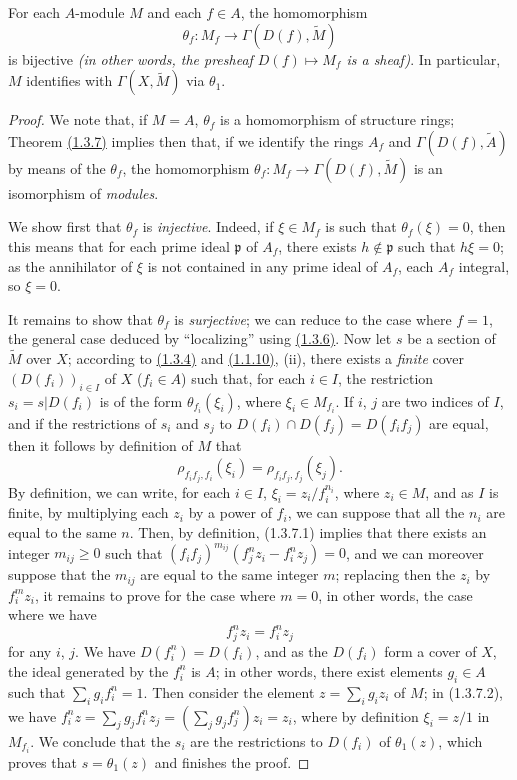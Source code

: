 \begin{thm}[1.3.7]
\label{thm-1.1.3.7}
For each $A$-module $M$ and each $f\in A$, the homomorphism
\[
  \theta_f:M_f\longrightarrow\Gamma(D(f),\widetilde{M})
\]
is bijective {\em (in other words, the presheaf $D(f)\mapsto M_f$ is a {\em sheaf})}. In
particular, $M$ identifies with $\Gamma(X,\widetilde{M})$ via $\theta_1$.
\end{thm}

\begin{proof}
\label{proof-thm-1.1.3.7}
We note that, if $M=A$, $\theta_f$ is a homomorphism of structure rings; Theorem
\hyperref[thm-1.1.3.7]{(1.3.7)} implies then that, if we identify the rings $A_f$ and
$\Gamma(D(f),\widetilde{A})$ by means of the $\theta_f$, the homomorphism
$\theta_f:M_f\to\Gamma(D(f),\widetilde{M})$ is an isomorphism of {\em modules}.

We show first that $\theta_f$ is {\em injective}. Indeed, if $\xi\in M_f$ is such that
$\theta_f(\xi)=0$, then this means that for each prime ideal $\mathfrak{p}$ of $A_f$, there
exists $h\not\in\mathfrak{p}$ such that $h\xi=0$; as the annihilator of $\xi$ is not
contained in any prime ideal of $A_f$, each $A_f$ integral, so $\xi=0$.

It remains to show that $\theta_f$ is {\em surjective}; we can reduce to the case where
$f=1$, the general case deduced by ``localizing'' using \hyperref[prop-1.1.3.6]{(1.3.6)}. Now let $s$ be a
section of $\widetilde{M}$ over $X$; according to \hyperref[defn-1.1.3.4]{(1.3.4)} and
\hyperref[prop-1.1.1.10]{(1.1.10)}, (ii), there exists a {\em finite} cover $(D(f_i))_{i\in I}$ of $X$
($f_i\in A$) such that, for each $i\in I$, the restriction $s_i=s|D(f_i)$ is of the form
$\theta_{f_i}(\xi_i)$, where $\xi_i\in M_{f_i}$. If $i$, $j$ are two indices of $I$, and if
the restrictions of $s_i$ and $s_j$ to $D(f_i)\cap D(f_j)=D(f_i f_j)$ are equal, then
it follows by definition of $M$ that
\[
  \rho_{f_i f_j,f_i}(\xi_i)=\rho_{f_i f_j,f_j}(\xi_j).
  \tag{1.3.7.1}
\]
By definition, we can write, for each $i\in I$, $\xi_i=z_i/f_i^{n_i}$, where $z_i\in M$, and
as $I$ is finite, by multiplying each $z_i$ by a power of $f_i$, we can suppose that all the
$n_i$ are equal to the same $n$. Then, by definition, (1.3.7.1) implies that there exists an
integer $m_{ij}\geqslant 0$ such that $(f_i f_j)^{m_{ij}}(f_j^n z_i-f_i^n z_j)=0$, and we can
moreover suppose that the $m_{ij}$ are equal to the same integer $m$; replacing then the
$z_i$ by $f_i^m z_i$, it remains to prove for the case where $m=0$, in other words, the case
where we have
\[
  f_j^n z_i=f_i^n z_j
  \tag{1.3.7.2}
\]
for any $i$, $j$. We have $D(f_i^n)=D(f_i)$, and as the $D(f_i)$ form a cover of $X$,
the ideal generated by the $f_i^n$ is $A$; in other words, there exist elements $g_i\in A$
such that $\sum_i g_i f_i^n=1$. Then consider the element $z=\sum_i g_i z_i$ of $M$; in
(1.3.7.2), we have $f_i^n z=\sum_j g_j f_i^n z_j=(\sum_j g_j f_j^n)z_i=z_i$, where by
definition $\xi_i=z/1$ in $M_{f_i}$. We conclude
that the $s_i$ are the restrictions to $D(f_i)$ of $\theta_1(z)$, which proves that
$s=\theta_1(z)$ and finishes the proof.
\end{proof}

